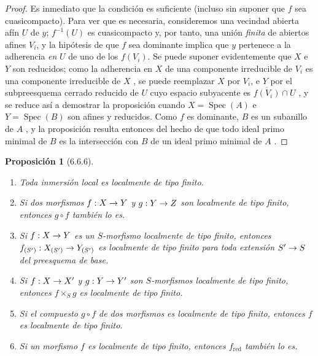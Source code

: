 \documentclass[oneside]{amsart}
\theoremstyle{ega-env-style}
\theoremstyle{ega-thm-env-style}
\newtheorem*{proposition}{Proposición}
\theoremstyle{ega-defn-env-style}
\renewcommand{\to}{\mathchoice{\longrightarrow}{\rightarrow}{\rightarrow}{\rightarrow}}
\let\EGAOriginalLabel\label
\renewcommand{\label}[1]{\phantomsection\EGAOriginalLabel{#1}}
\begin{document}
\begin{proof}
Es inmediato que la condición es suficiente (incluso sin suponer que $f$ sea cuasicompacto).
Para ver que es necesaria, consideremos una vecindad abierta afín $U$ de $y$;
$f^{-1}(U)$ es cuasicompacto y, por tanto, una unión \emph{finita} de abiertos afines $V_i$, y la hipótesis de que $f$ sea dominante implica que $y$ pertenece a la adherencia \emph{en} $U$ de uno de los $f(V_i)$.
Se puede suponer evidentemente que $X$ e $Y$ son reducidos;
como la adherencia en $X$ de una componente irreducible de $V_i$ es una componente irreducible de $X$ , se puede reemplazar $X$ por $V_i$, e $Y$ por el subpreesquema cerrado reducido de $U$ cuyo espacio subyacente es $\overline{f(V_i)}\cap U$ , y se reduce así a demostrar la proposición cuando $X=\operatorname{Spec}(A)$ e $Y=\operatorname{Spec}(B)$ son afines y reducidos.
Como $f$ es dominante, $B$ es un subanillo de $A$ , y la proposición resulta entonces del hecho de que todo ideal primo minimal de $B$ es la intersección con $B$ de un ideal primo minimal de $A$ .
\end{proof}

\begin{proposition}[6.6.6]
\label{I.6.6.6}
\medskip\noindent
\begin{enumerate}
  \item[{\rm(i)}] Toda inmersión local es localmente de tipo finito.
  \item[{\rm(ii)}] Si dos morfismos $f:X\to Y$ y $g:Y\to Z$ son localmente de tipo finito, entonces $g\circ f$ también lo es.
  \item[{\rm(iii)}] Si $f:X\to Y$ es un $S$-morfismo localmente de tipo finito, entonces $f_{(S')}:X_{(S')}\to Y_{(S')}$ es localmente de tipo finito para toda extensión $S'\to S$ del preesquema de base.
  \item[{\rm(iv)}] Si $f:X\to X'$ y $g:Y\to Y'$ son $S$-morfismos localmente de tipo finito, entonces $f\times_S g$ es localmente de tipo finito.
  \item[{\rm(v)}] Si el compuesto $g\circ f$ de dos morfismos es localmente de tipo finito, entonces $f$ es localmente de tipo finito.
  \item[{\rm(vi)}] Si un morfismo $f$ es localmente de tipo finito, entonces $f_{\mathrm{red}}$ también lo es.
\end{enumerate}
\end{proposition}
\end{document}
